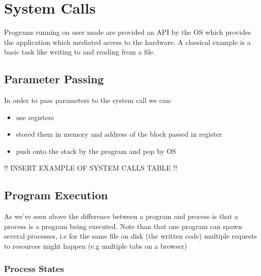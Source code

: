 \section{System Calls}




	\par{Programs running on user mode are provided an API by the OS which provides the application which mediated access to the hardware. A classical example is a basic task like writing to and reading from a file.}

	\subsection{Parameter Passing}

		\par{In order to pass parameters to the system call we can:}

		\begin{itemize}
			\item[] use registers
			\item[] stored them in memory and address of the block passed in register
			\item[] push onto the stack by the program and pop by OS
		\end{itemize}

	!! INSERT EXAMPLE OF SYSTEM CALLS TABLE !!

\subsection{Program Execution}

	\par{As we've seen above the difference between a program and process is that a process is a program being executed. Note than that one program can spawn several processes, i.e for the same file on disk (the written code) multiple requests to resources might happen (e.g multiple tabs on a browser)}

	\subsubsection{Process States}

